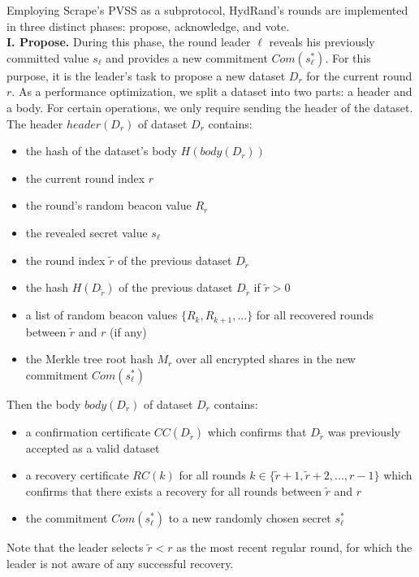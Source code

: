 \documentclass[11pt]{article}
\theoremstyle{definition}
\theoremstyle{remark}
\begin{document}
Employing Scrape's PVSS as a subprotocol, HydRand's rounds are implemented in three distinct phases: propose, acknowledge, and vote.\\

\textbf{I. Propose.} During this phase, the round leader $\ell$ reveals his previously committed value $s_\ell$ and provides a new commitment $Com(s^*_\ell)$. For this purpose, it is the leader's task to propose a new dataset $D_r$ for the current round $r$. As a performance optimization, we split a dataset into two parts: a header and a body. For certain operations, we only require sending the header of the dataset. The header $header(D_r)$ of dataset $D_r$ contains:
\begin{itemize}
\item the hash of the dataset's body $H(body(D_r))$
\item the current round index $r$
\item the round's random beacon value $R_r$
\item the revealed secret value $s_\ell$
\item the round index $\tilde{r}$ of the previous dataset $D_{\tilde{r}}$
\item the hash $H(D_{\tilde{r}})$ of the previous dataset $D_{\tilde{r}}$ if $\tilde{r} > 0$
\item a list of random beacon values $\{R_k, R_{k + 1}, ...\}$ for all recovered rounds between $\tilde{r}$ and $r$ (if any)
\item the Merkle tree root hash $M_r$ over all encrypted shares in the new commitment $Com(s^*_\ell)$
\end{itemize}

Then the body $body(D_r)$ of dataset $D_r$ contains:
\begin{itemize}
\item a confirmation certificate $CC(D_{\tilde{r}})$ which confirms that $D_{\tilde{r}}$ was previously accepted as a valid dataset
\item a recovery certificate $RC(k)$ for all rounds $k \in \{\tilde{r} + 1, \tilde{r} + 2, ..., r - 1\}$ which confirms that there exists a recovery for all rounds between $\tilde{r}$ and $r$
\item the commitment $Com(s^*_\ell)$ to a new randomly chosen secret $s^*_\ell$
\end{itemize}
Note that the leader selects $\tilde{r} < r$ as the most recent regular round, for which the leader is not aware of any successful recovery.
\end{document}
